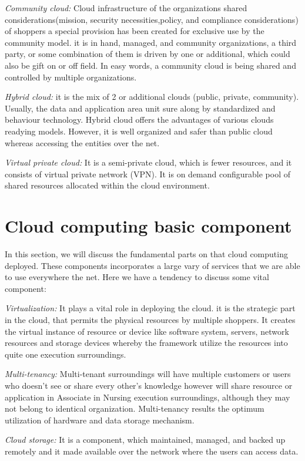 \textit{Community cloud:} Cloud infrastructure of the organizations shared considerations(mission, security necessities,policy, and compliance considerations) of shoppers a special provision has been created for exclusive use by the community model. it is in hand, managed, and community organizations, a third party, or some combination of them is driven by one or additional, which could also be gift on or off field. In easy words, a community cloud is being shared and controlled by multiple organizations.

\textit{Hybrid cloud:} it is the mix of 2 or additional clouds (public, private, community). Usually, the data and application area unit sure along by standardized and behaviour technology. Hybrid cloud offers the advantages of various clouds readying models. However, it is well organized and safer than public cloud whereas accessing the entities over the net.

\textit{Virtual private cloud:} It is a semi-private cloud, which is fewer resources, and it consists of virtual private network (VPN). It is on demand configurable pool of shared resources allocated within the cloud environment.

\section{Cloud computing basic component}
 
 In this section, we will discuss the fundamental parts on that cloud computing deployed. These components incorporates a large vary of services that we are able to use everywhere the net. Here we have a tendency to discuss some vital component:
 
 \textit{ Virtualization:} It plays a vital role in deploying the cloud. it is the strategic part in the cloud, that permits the physical resources by multiple shoppers. It creates the virtual instance of resource or device like software system, servers, network resources and storage devices whereby the framework utilize the resources into quite one execution surroundings.
 
 \textit{ Multi-tenancy:} Multi-tenant surroundings will have multiple customers or users who doesn't see or share every other’s knowledge however will share resource or application in Associate in Nursing execution surroundings, although they
 may not belong to identical organization. Multi-tenancy results the optimum utilization of hardware and data storage mechanism.
 
 \textit{Cloud storage:} It is a component, which maintained, managed, and backed up remotely and it made available over the network where the users can access data.

